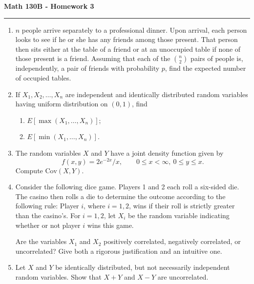 \documentclass[11pt,letterpaper]{article}
\newcommand{\Cov}{\text{Cov}}
\begin{document}
\begin{center}
{\bf \Large Math 130B - Homework 3}
\vspace{0.2cm}
\hrule
\end{center}



\begin{enumerate}

    \item $n$ people arrive separately to a professional dinner.
    Upon arrival, each person looks to see if he or she has any friends among those present.
    That person then sits either at the table of a friend or at an unoccupied table if none of those present is a friend.
    Assuming that each of the $\binom{n}{2}$ pairs of people is, independently, a pair of friends with probability $p$, find the expected number of occupied tables.

    \item If $X_1, X_2, \ldots, X_n$ are independent and identically distributed random variables having uniform distribution on $(0,1)$, find
    \begin{enumerate}
        \item $E[\max(X_1, \ldots, X_n)]$;
        \item $E[\min(X_1, \ldots, X_n)]$.
    \end{enumerate}

    \item The random variables $X$ and $Y$ have a joint density function given by
    \[
        f(x,y) = 2e^{-2x}/x,\qquad 0\leq x < \infty,\ 0\leq y\leq x.
    \]
    Compute $\Cov(X,Y)$.


    \item Consider the following dice game.
    Players 1 and 2 each roll a six-sided die.
    The casino then rolls a die to determine the outcome according to the following rule:
    Player $i$, where $i = 1,2$, wins if their roll is strictly greater than the casino's.
    For $i = 1,2$, let $X_i$ be the random variable indicating whether or not player $i$ wins this game.

    Are the variables $X_1$ and $X_2$ positively correlated, negatively correlated, or uncorrelated?
    Give both a rigorous justification and an intuitive one.


    \item Let $X$ and $Y$ be identically distributed, but not necessarily independent random variables.
    Show that $X+Y$ and $X-Y$ are uncorrelated.


\end{enumerate}
\end{document}
